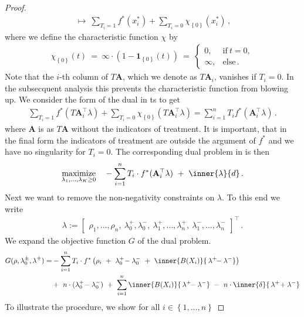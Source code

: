 \begin{proof}
\begin{gather*}
  \ 
  \mapsto
  \ 
  \sum_{T_i=1} f^*(x^*_i)
  +
  \sum_{T_i=0} 
  \chi_{\left\{ 0 \right\}}(x^*_i)
  \,,
\end{gather*}
where we define the characteristic function $\chi$ by
\begin{gather*}
  \chi_{\left\{ 0 \right\}}
  (t)
  \ 
  =
  \ 
  \infty
  \cdot
  (
  1-\mathbf{1}_{\left\{ 0 \right\}}(t)
  )
  \ 
  =
  \ 
  \begin{cases}
    0,& \text{if}\ t=0,\\
    \infty,& \text{else}\,.
  \end{cases}
\end{gather*}
Note that the $i$-th column of $T\mathbf{A}$,
which we denote as 
$T\mathbf{A}_i$,
vanishes if 
$T_i=0$. 
In the subsecquent analysis
this prevents the characteristic function from blowing up.
We consider the form of the dual in ts to get
\begin{gather*}
  \sum_{T_i=1}  f^*(T\mathbf{A}_{ i}^\top\lambda)
  +
  \sum_{T_i=0} 
  \chi_{\left\{ 0 \right\}}
(T\mathbf{A}_{i}^\top\lambda)
  =
  \sum_{i=1}^n T_i f^*(\mathbf{A}_{ i}^\top\lambda)
  \,.
\end{gather*}
where
$\mathbf{A}$
 is as $T\mathbf{A}$ without the indicators of treatment.
 It is important, that in the final form the indicators of treatment are outside the argument of $f^*$ and we have no singularity for 
 $T_i=0$.
The corresponding dual problem in \cite{Tseng1991} is then
\begin{gather*}
  \underset
  {\lambda_1,\ldots,\lambda_{K}\ge 0}
  {
  \mathrm{maximize}
  }
  \quad
  -
  \sum_{i=1} 
  ^n
  T_i
  \cdot
  f^*
(\mathbf{A}_{ i}^\top\lambda)
  \ 
  +
  \ 
  \inner{\lambda}{d}
  \,.
\end{gather*}
  Next we want to remove the non-negativity constraints on $\lambda$.
  To this end we write
  \begin{gather}
    \lambda
    :=
    \begin{bmatrix}
      \rho_1,
      \ldots,
      \rho_n,
      \ 
      \lambda_0^+,
      \lambda_0^-,
      \ 
      \lambda_1^+,
      \ldots,
      \lambda_n^+,
      \ 
      \lambda_1^-,
      \ldots,
      \lambda_n^-
    \end{bmatrix}
    ^\top
    \,.
  \end{gather}
  We expand the objective function $G$ of the dual problem.
  \begin{align*}
    G
    (
    \rho,
    \lambda_0^\pm,
    \lambda^\pm
    )
    =
  &-
  \sum_{i=1} 
  ^n
  T_i
  \cdot
  f^*
  \left( 
\rho_i
\ 
+
\ 
\lambda_0^+
\!
-
\lambda_0^-
\ 
+
\ 
\inner
{B(X_i)}
{\,\lambda^+ \!\!- \lambda^-}
  \right)
  \\
  &+
  \ 
  n
  \cdot
  (
\lambda_0^+
\!
-
\lambda_0^-
  )
  \ 
+
  \ 
  \sum_{i=1} 
  ^n
\inner
{B(X_i)}
{\,\lambda^+ \!\!- \lambda^-}
  \ 
-
  \ 
  n
  \cdot
\inner
{\delta}
{\,\lambda^+ \!+ \lambda^-}
  \end{align*}
  To illustrate the procedure, we show 
  for all $i \in \left\{ 1,\ldots,n \right\}$



\end{proof}
